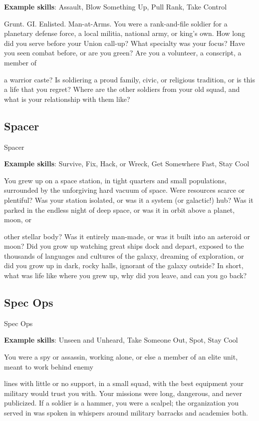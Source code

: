 \textbf{Example skills}: Assault, Blow Something Up, Pull Rank, Take Control

Grunt. GI. Enlisted. Man-at-Arms. You were a rank-and-file soldier for a planetary defense force, a local
militia, national army, or king’s own. How long did you serve before your Union call-up? What specialty was
your focus? Have you seen combat before, or are you green? Are you a volunteer, a conscript, a member of

a warrior caste? Is soldiering a proud family, civic, or religious tradition, or is this a life that you regret?
Where are the other soldiers from your old squad, and what is your relationship with them like?

\subsection{Spacer}
                                                       Spacer


\textbf{Example skills}: Survive, Fix, Hack, or Wreck, Get Somewhere Fast, Stay Cool

You grew up on a space station, in tight quarters and small populations, surrounded by the unforgiving hard
vacuum of space. Were resources scarce or plentiful? Was your station isolated, or was it a system (or
galactic!) hub? Was it parked in the endless night of deep space, or was it in orbit above a planet, moon, or

other stellar body? Was it entirely man-made, or was it built into an asteroid or moon? Did you grow up
watching great ships dock and depart, exposed to the thousands of languages and cultures of the galaxy,
dreaming of exploration, or did you grow up in dark, rocky halls, ignorant of the galaxy outside? In short,
what was life like where you grew up, why did you leave, and can you go back?

\subsection{Spec Ops}
                                                     Spec Ops

\textbf{Example skills}: Unseen and Unheard, Take Someone Out, Spot, Stay Cool

You were a spy or assassin, working alone, or else a member of an elite unit, meant to work behind enemy

lines with little or no support, in a small squad, with the best equipment your military would trust you with.
Your missions were long, dangerous, and never publicized. If a soldier is a hammer, you were a scalpel; the
organization you served in was spoken in whispers around military barracks and academies both.

